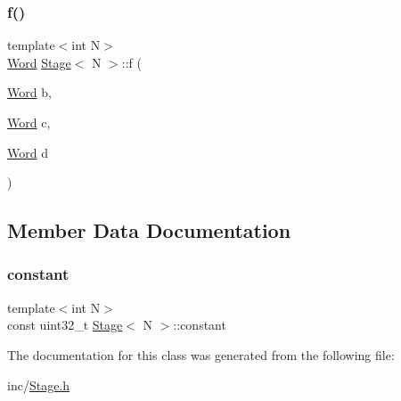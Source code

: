 \subsubsection{\texorpdfstring{f()}{f()}}
{\footnotesize\ttfamily template$<$int N$>$ \\
\mbox{\hyperlink{class_word}{Word}} \mbox{\hyperlink{class_stage}{Stage}}$<$ N $>$\+::f (\begin{DoxyParamCaption}\item[{\mbox{\hyperlink{class_word}{Word}}}]{b,  }\item[{\mbox{\hyperlink{class_word}{Word}}}]{c,  }\item[{\mbox{\hyperlink{class_word}{Word}}}]{d }\end{DoxyParamCaption})}



\subsection{Member Data Documentation}
\mbox{\label{class_stage_ab336683e1d732c61d4eb6a67c05b28db}} 
\subsubsection{\texorpdfstring{constant}{constant}}
{\footnotesize\ttfamily template$<$int N$>$ \\
const uint32\+\_\+t \mbox{\hyperlink{class_stage}{Stage}}$<$ N $>$\+::constant\hspace{0.3cm}{\ttfamily [static]}}



The documentation for this class was generated from the following file\+:\begin{DoxyCompactItemize}
\item 
inc/\mbox{\hyperlink{_stage_8h}{Stage.\+h}}\end{DoxyCompactItemize}
